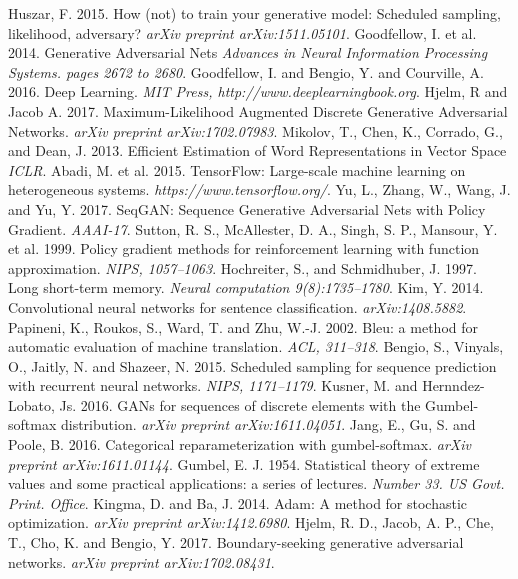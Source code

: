 \documentclass[a4paper,conference]{IEEEtran}
\begin{document}
\begin{thebibliography}{99}
 Huszar, F. 2015. How (not) to train your generative model: Scheduled sampling, likelihood, adversary? \textit{arXiv preprint arXiv:1511.05101}.
 Goodfellow, I. et al. 2014. Generative Adversarial Nets \textit{Advances in Neural Information Processing Systems. pages 2672 to 2680}.
 Goodfellow, I. and Bengio, Y. and Courville, A. 2016. Deep Learning. \textit{MIT Press, http://www.deeplearningbook.org}.
 Hjelm, R and Jacob A. 2017. Maximum-Likelihood Augmented Discrete Generative Adversarial Networks. \textit{arXiv preprint arXiv:1702.07983}.
 Mikolov, T., Chen, K., Corrado, G., and Dean, J. 2013. Efficient Estimation of Word Representations in Vector Space \textit{ICLR}.
 Abadi, M. et al. 2015. TensorFlow: Large-scale machine learning on heterogeneous systems. \textit{https://www.tensorflow.org/}.
 Yu, L., Zhang, W., Wang, J. and Yu, Y. 2017. SeqGAN: Sequence Generative Adversarial Nets with Policy Gradient. \textit{AAAI-17}.
 Sutton, R. S., McAllester, D. A., Singh, S. P.,
Mansour, Y. et al. 1999. Policy gradient methods for reinforcement
learning with function approximation. \textit{NIPS, 1057–1063}.
 Hochreiter, S., and Schmidhuber,
J. 1997. Long short-term memory. \textit{Neural computation
9(8):1735–1780}.
 Kim, Y. 2014. Convolutional neural networks for sentence
classification. \textit{arXiv:1408.5882}.
 Papineni, K., Roukos, S., Ward, T. and Zhu,
W.-J. 2002. Bleu: a method for automatic evaluation of machine
translation. \textit{ACL, 311–318}.
 Bengio, S., Vinyals, O., Jaitly, N. and Shazeer,
N. 2015. Scheduled sampling for sequence prediction with recurrent
neural networks. \textit{NIPS, 1171–1179}.
 Kusner, M. and Hernndez-Lobato, Js. 2016. GANs for sequences of discrete elements with the Gumbel-softmax
distribution. \textit{arXiv preprint arXiv:1611.04051}.
 Jang, E., Gu, S. and Poole, B. 2016. Categorical reparameterization with gumbel-softmax. \textit{arXiv preprint arXiv:1611.01144}.
 Gumbel, E. J. 1954. Statistical theory of extreme values and some practical applications: a series of lectures. \textit{Number 33. US Govt. Print. Office}.
 Kingma, D. and Ba, J. 2014. Adam: A method for stochastic optimization. \textit{arXiv preprint arXiv:1412.6980}.
 Hjelm, R. D., Jacob, A. P., Che, T., Cho, K. and Bengio, Y. 2017. Boundary-seeking generative adversarial networks. \textit{arXiv preprint arXiv:1702.08431}.

\end{thebibliography}
\end{document}
